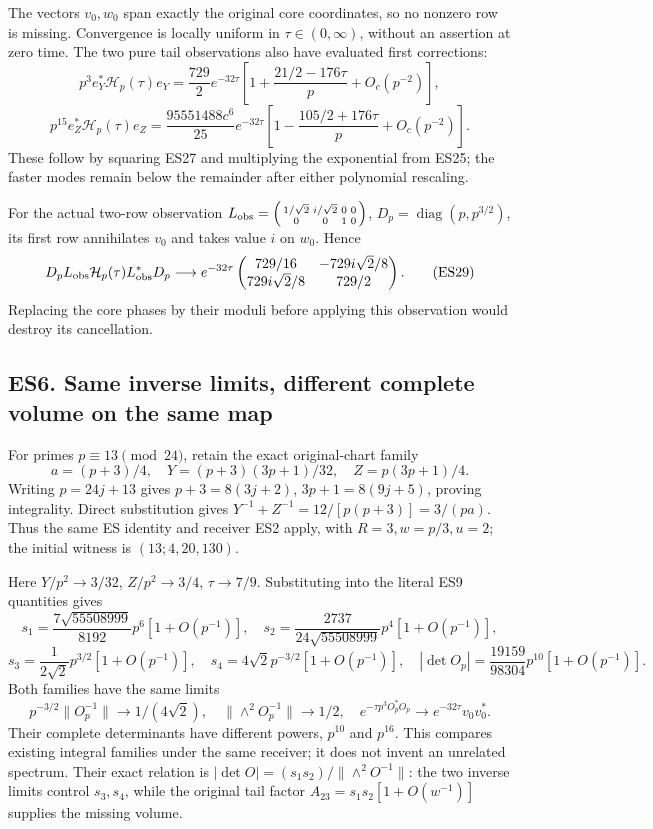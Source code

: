 The vectors \(v_0,w_0\) span exactly the original core coordinates, so no nonzero row is missing. Convergence is locally uniform in \(\tau\in(0,\infty)\), without an assertion at zero time. The two pure tail observations also have evaluated first corrections: \[
p^3e_Y^*\mathcal H_p(\tau)e_Y
=\frac{729}{2}e^{-32\tau}\left[1+\frac{21/2-176\tau}{p}+O_c(p^{-2})\right],
\] \[
p^{15}e_Z^*\mathcal H_p(\tau)e_Z
=\frac{95551488c^6}{25}e^{-32\tau}\left[1-\frac{105/2+176\tau}{p}+O_c(p^{-2})\right].
\tag{ES28}
\] These follow by squaring ES27 and multiplying the exponential from ES25; the faster modes remain below the remainder after either polynomial rescaling.

For the actual two-row observation \(L_{\rm obs}=\left(\begin{smallmatrix}1/\sqrt2&i/\sqrt2&0&0\\0&0&1&0\end{smallmatrix}\right)\), \(D_p=\operatorname{diag}(p,p^{3/2})\), its first row annihilates \(v_0\) and takes value \(i\) on \(w_0\). Hence \[
D_pL_{\rm obs}\mathcal H_p(\tau)L_{\rm obs}^*D_p
\longrightarrow e^{-32\tau}
\begin{pmatrix}729/16&-729i\sqrt2/8\\729i\sqrt2/8&729/2\end{pmatrix}.
\tag{ES29}
\] Replacing the core phases by their moduli before applying this observation would destroy its cancellation.

\subsection{ES6. Same inverse limits, different complete volume on the same map}\label{es6.-same-inverse-limits-different-complete-volume-on-the-same-map}

For primes \(p\equiv13\pmod{24}\), retain the exact original-chart family \[
a=(p+3)/4,\quad Y=(p+3)(3p+1)/32,\quad Z=p(3p+1)/4.
\tag{ES30}
\] Writing \(p=24j+13\) gives \(p+3=8(3j+2)\), \(3p+1=8(9j+5)\), proving integrality. Direct substitution gives \(Y^{-1}+Z^{-1}=12/[p(p+3)]=3/(pa)\). Thus the same ES identity and receiver ES2 apply, with \(R=3,w=p/3,u=2\); the initial witness is \((13;4,20,130)\).

Here \(Y/p^2\to3/32\), \(Z/p^2\to3/4\), \(\tau\to7/9\). Substituting into the literal ES9 quantities gives \[
s_1=\frac{7\sqrt{55508999}}{8192}p^6[1+O(p^{-1})],\quad
s_2=\frac{2737}{24\sqrt{55508999}}p^4[1+O(p^{-1})],
\] \[
s_3=\frac1{2\sqrt2}p^{3/2}[1+O(p^{-1})],\quad
s_4=4\sqrt2p^{-3/2}[1+O(p^{-1})],\quad
|\det O_p|=\frac{19159}{98304}p^{10}[1+O(p^{-1})].
\tag{ES31}
\] Both families have the same limits \[
p^{-3/2}\|O_p^{-1}\|\to1/(4\sqrt2),\quad
\|\wedge^2O_p^{-1}\|\to1/2,\quad
e^{-\tau p^3O_p^*O_p}\to e^{-32\tau}v_0v_0^*.
\tag{ES32}
\] Their complete determinants have different powers, \(p^{10}\) and \(p^{16}\). This compares existing integral families under the same receiver; it does not invent an unrelated spectrum. Their exact relation is \(|\det O|=(s_1s_2)/\|\wedge^2O^{-1}\|\): the two inverse limits control \(s_3,s_4\), while the original tail factor \(A_{23}=s_1s_2[1+O(w^{-1})]\) supplies the missing volume.

